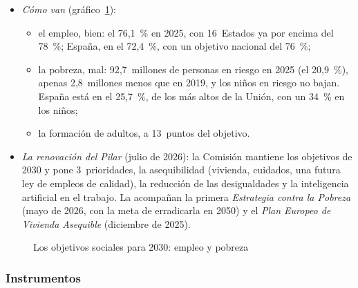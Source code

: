 \documentclass[11pt]{article}
\begin{document}
\begin{itemize}
\begin{itemize}
  \end{itemize}
\item \emph{Cómo van} (gráfico~\ref{fig:pilar}):
  \begin{itemize}
  \item el empleo, bien: el 76,1~\% en 2025, con 16~Estados ya por encima del 78~\%; España, en el 72,4~\%, con un objetivo nacional del 76~\%\nocite{Eurostat2026Empleo,Consejo2026EMCO};
  \item la pobreza, mal: 92,7~millones de personas en riesgo en 2025 (el 20,9~\%), apenas 2,8~millones menos que en 2019, y los niños en riesgo no bajan. España está en el 25,7~\%, de los más altos de la Unión, con un 34~\% en los niños\nocite{Eurostat2026AROPE};
  \item la formación de adultos, a 13~puntos del objetivo.
  \end{itemize}
\item \emph{La renovación del Pilar} (julio de 2026): la Comisión mantiene los objetivos de 2030 y pone 3~prioridades, la asequibilidad (vivienda, cuidados, una futura ley de empleos de calidad), la reducción de las desigualdades y la inteligencia artificial en el trabajo. La acompañan la primera \emph{Estrategia contra la Pobreza} (mayo de 2026, con la meta de erradicarla en 2050) y el \emph{Plan Europeo de Vivienda Asequible} (diciembre de 2025)\nocite{CE2026Pilar,CE2026Pobreza}.
\end{itemize}

\begin{figure}[H]
\centering
\caption{Los objetivos sociales para 2030: empleo y pobreza}\label{fig:pilar}
\end{figure}

\subsubsection{Instrumentos}
\end{document}
